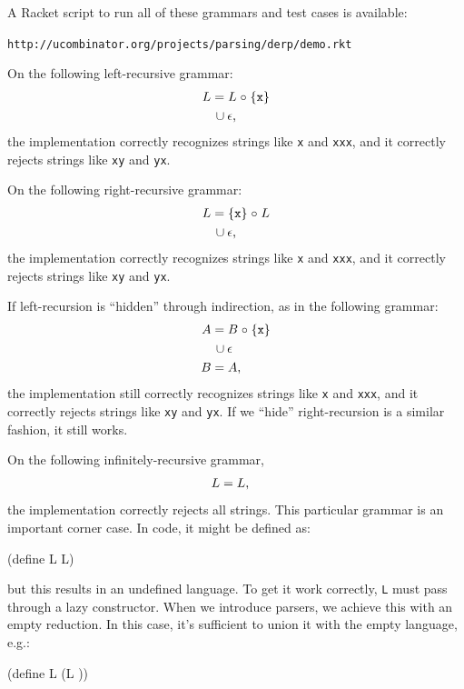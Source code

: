 A Racket script to run all of these grammars and test cases is available:
\begin{center}
 \verb+http://ucombinator.org/projects/parsing/derp/demo.rkt+
\end{center}


\begin{example}
On the following left-recursive grammar:
\begin{align*}
  L &=  L \mathrel{\circ} \left\{\tt x\right\} 
  \\
    &\,\cup \epsilon
  \text,
\end{align*}
%
the implementation correctly recognizes strings like {\tt x} and {\tt xxx}, and
it correctly rejects strings like {\tt xy} and {\tt yx}.
\end{example}




\begin{example}
On the following right-recursive grammar:
\begin{align*}
  L &=  \left\{\tt x\right\} \mathrel{\circ} L 
  \\
    &\,\cup \epsilon
  \text,
\end{align*}
%
the implementation correctly recognizes strings like {\tt x} and {\tt xxx}, and
it correctly rejects strings like {\tt xy} and {\tt yx}.
\end{example}



\begin{example}
If left-recursion is ``hidden'' through indirection, as
in the following grammar:
\begin{align*}
  A &=  B \mathrel{\circ} \left\{\tt x\right\} 
  \\
    &\,\cup \epsilon
  \\
  B &= A
  \text,
\end{align*}
%
the implementation still correctly recognizes strings like {\tt x} and {\tt xxx}, and
it correctly rejects strings like {\tt xy} and {\tt yx}.
%
If we ``hide'' right-recursion is a similar fashion, it still works.
\end{example}




\begin{example}
On the following infinitely-recursive grammar,
\begin{align*}
  L &=  L 
  \text,
\end{align*}
%
the implementation correctly rejects all strings.
%
This particular grammar is an important corner case.
%
In code, it might be defined as:
\begin{code}
 (define L L)\end{code}
but this results in an undefined language.
%
To get it work correctly, {\tt L} must pass through a lazy constructor.
%
When we introduce parsers, we achieve this with an empty reduction.
%
In this case, it's sufficient to union it with the empty language, e.g.:
\begin{code}
 (define L (\ttcup L \ttempty))\end{code}
\end{example}


